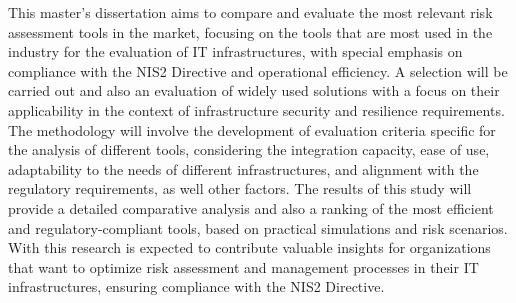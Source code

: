This master's dissertation aims to compare and evaluate the most relevant risk assessment tools in the market, focusing on the tools that are most used in the industry
 for the evaluation of IT infrastructures, with special emphasis on compliance with the NIS2 Directive and operational efficiency. A selection will be carried out and also an
 evaluation of widely used solutions with a focus on their applicability in the context of infrastructure security and resilience requirements. The methodology will involve
 the development of evaluation criteria specific for the analysis of different tools, considering the integration capacity, ease of use, adaptability to the needs of different
 infrastructures, and alignment with the regulatory requirements, as well other factors. The results of this study will provide a detailed comparative analysis and also a ranking
 of the most efficient and regulatory-compliant tools, based on practical simulations and risk scenarios. With this research is expected to contribute valuable insights for
 organizations that want to optimize risk assessment and management processes in their IT infrastructures, ensuring compliance with the NIS2 Directive.


